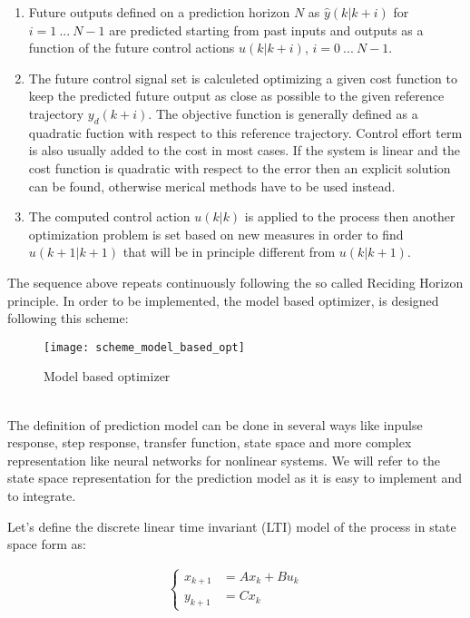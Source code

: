 \begin{enumerate}
\item Future outputs defined on a prediction horizon $N$ as $\hat{y}(k|k+i)$ for $i=1\ ...\ N-1$ are predicted starting from past inputs and outputs as a function of the future control actions $u(k|k+i)$, $i=0\ ...\ N-1$.
\item The future control signal set is calculeted optimizing a given cost function to keep the predicted future output as close as possible to the given reference trajectory $y_d(k+i)$. The objective function is generally defined as a quadratic fuction with respect to this reference trajectory. Control effort term is also usually added to the cost in most cases. If the system is linear and the cost function is quadratic with respect to the error then an explicit solution can be found, otherwise merical methods have to be used instead.
\item The computed control action $u(k|k)$ is applied to the process then another optimization problem is set based on new measures in order to find $u(k+1|k+1)$ that will be in principle different from $u(k|k+1)$. 
\end{enumerate}
The sequence above repeats continuously following the so called Reciding Horizon principle. In order to be implemented, the model based optimizer, is designed following this scheme: \\
\begin{figure}[h!]
	\centering
	\texttt{[image: scheme\_model\_based\_opt]}
	\caption{Model based optimizer}
	\label{scheme_model_based_opt}
\end{figure}
\\
The definition of prediction model can be done in several ways like inpulse response, step response, transfer function, state space and more complex representation like neural networks for nonlinear systems. We will refer to the state space representation for the prediction model as it is easy to implement and to integrate.

Let's define the discrete linear time invariant (LTI) model of the process in state space form as:

\begin{equation}
	\begin{split}
		\begin{cases}
			x_{k+1}&=Ax_k+Bu_k \\
			y_{k+1}&=Cx_k
		\end{cases}
	\end{split}
\end{equation}

